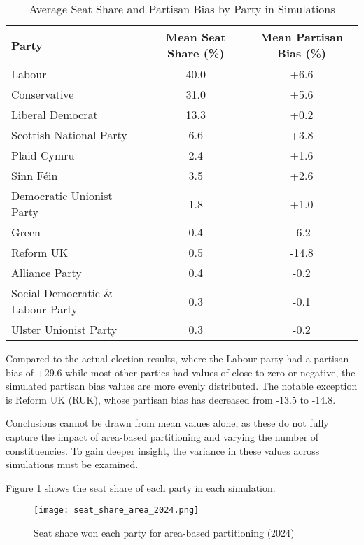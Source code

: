 \documentclass{article}
\begin{document}
\begin{table}[H]
    \centering
    \begin{tabular}{l|c|c}
        \hline
        \textbf{Party} & \textbf{Mean Seat Share (\%)} & \textbf{Mean Partisan Bias (\%)} \\
        \hline
        Labour & 40.0 & +6.6 \\
        Conservative & 31.0 & +5.6 \\
        Liberal Democrat & 13.3 & +0.2 \\
        Scottish National Party & 6.6 & +3.8 \\
        Plaid Cymru & 2.4 & +1.6 \\
        Sinn Féin & 3.5 & +2.6 \\
        Democratic Unionist Party & 1.8 & +1.0 \\
        Green & 0.4 & -6.2 \\
        Reform UK & 0.5 & -14.8 \\
        Alliance Party & 0.4 & -0.2 \\
        Social Democratic \& Labour Party & 0.3 & -0.1 \\
        Ulster Unionist Party & 0.3 & -0.2 \\
        \hline
    \end{tabular}
    \caption{Average Seat Share and Partisan Bias by Party in Simulations}
    \label{tab:seat_share_partisan_bias_area_2024}
\end{table}

Compared to the actual election results, where the Labour party had a partisan bias of +29.6 while most other parties had values of close to zero or negative, the simulated
partisan bias values are more evenly distributed. The notable exception is Reform UK (RUK), whose partisan bias has decreased from -13.5 to -14.8.

Conclusions cannot be drawn from mean values alone, as these do not fully capture the impact of area-based partitioning and varying the number of constituencies. 
To gain deeper insight, the variance in these values across simulations must be examined.

Figure \ref{fig:seat_share_area_2024} shows the seat share of each party in each simulation.

\begin{figure}[H]
    \centering
    \texttt{[image: seat\_share\_area\_2024.png]}
    \caption{Seat share won each party for area-based partitioning (2024)}
    \label{fig:seat_share_area_2024}
\end{figure}
\end{document}
